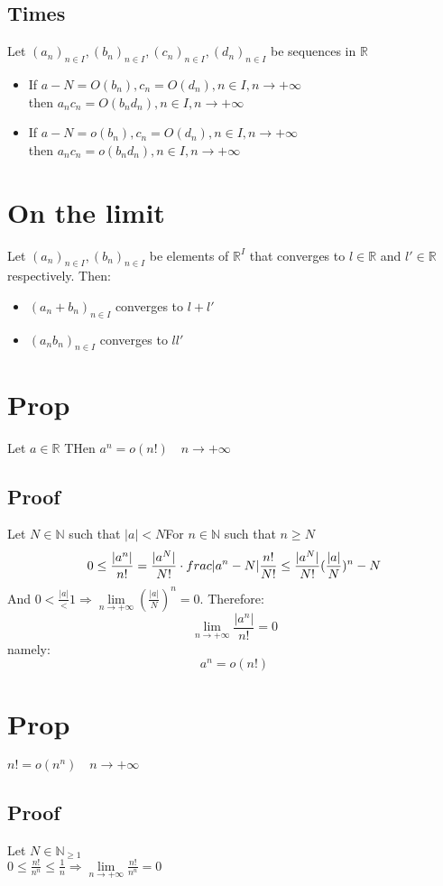 \documentclass{book}
\begin{document}
\subsection{Times}
Let $(a_n)_{n\in I},(b_n)_{n\in I},(c_n)_{n\in I},(d_n)_{n\in I}$ be sequences in $\mathbb{R} $\begin{itemize}
    \item If $a-N=O(b_n),c_n=O(d_n),n\in I,n\rightarrow+\infty$\\then $a_nc_n=O(b_nd_n),n\in I,n\rightarrow+\infty$
    \item If $a-N=o(b_n),c_n=O(d_n),n\in I,n\rightarrow+\infty$\\then $a_nc_n=o(b_nd_n),n\in I,n\rightarrow+\infty$
\end{itemize}
\section{On the limit}
Let $(a_n)_{n\in I},(b_n)_{n\in I}$ be elements of $\mathbb{R}^I $ that converges to $l\in \mathbb{R} $ and $l'\in\mathbb{R} $ respectively. Then:\begin{itemize}
    \item $(a_n+b_n)_{n\in I}$ converges to $l+l'$
    \item $(a_nb_n)_{n\in I}$ converges to $ll'$
\end{itemize}
\section{Prop}Let $a\in\mathbb{R} $ THen $a^n=o(n!)\quad n\rightarrow+\infty$
\subsection{Proof}Let $N\in \mathbb{N} $ such that $\lvert a\rvert<N$For $n\in\mathbb{N} $ such that $n\geq N$
$$0\leq\frac{\lvert a^n\rvert}{n!}=\frac{\lvert a^N\rvert}{N!}\cdot\\frac{\lvert a^n-N\rvert}{n!\over N!}\leq\frac{\lvert a^N\rvert}{N!}(\frac{\lvert a\rvert}{N})^n-N$$
And $0<\frac{\lvert a\rvert}<1\Rightarrow \lim\limits_{n\rightarrow+\infty}(\frac{\lvert a\rvert}{N})^n=0$. Therefore:
$$\lim\limits_{n\rightarrow+\infty}\frac{\lvert a^n\rvert}{n!}=0$$
namely:$$a^n=o(n!)$$
\section{Prop}$n!=o(n^n)\quad n\rightarrow+\infty$
\subsection{Proof}
Let $N\in\mathbb{N} _{\geq1}$\\$0\leq\frac{n!}{n^n}\leq\frac{1}{n}\Rightarrow \lim\limits_{n\rightarrow+\infty}\frac{n!}{n^n}=0$
\end{document}
